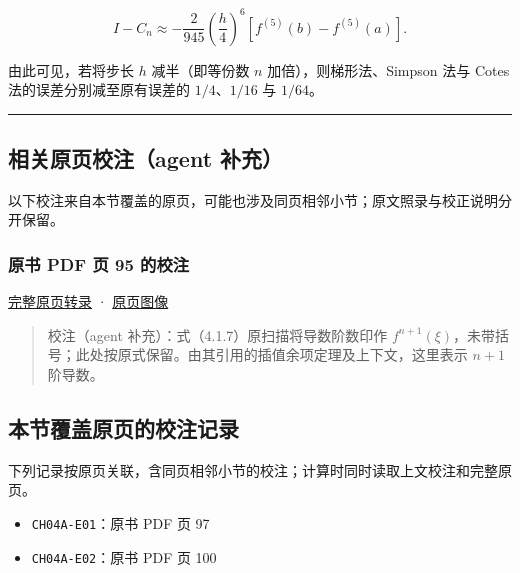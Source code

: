 \documentclass[
  10pt,
  fontset=fandol]{ctexart}
\providecommand{\tightlist}{%
  \setlength{\itemsep}{0pt}\setlength{\parskip}{0pt}}
\begin{document}
\[
I-C_n\approx-\frac2{945}\left(\frac h4\right)^6[f^{(5)}(b)-f^{(5)}(a)].
\tag{4.2.17}
\]

由此可见，若将步长 \(h\) 减半（即等份数 \(n\) 加倍），则梯形法、Simpson 法与 Cotes 法的误差分别减至原有误差的 \(1/4\)、\(1/16\) 与 \(1/64\)。

\begin{center}\rule{0.5\linewidth}{0.5pt}\end{center}

\subsection{相关原页校注（agent 补充）}\label{ux76f8ux5173ux539fux9875ux6821ux6ce8agent-ux8865ux5145}

以下校注来自本节覆盖的原页，可能也涉及同页相邻小节；原文照录与校正说明分开保留。

\subsubsection{原书 PDF 页 95 的校注}\label{ux539fux4e66-pdf-ux9875-95-ux7684ux6821ux6ce8}

\href{../pages/pdf-095.md}{完整原页转录} · \href{../../source-images/pdf-095.jpeg}{原页图像}

\begin{quote}
校注（agent 补充）：式（4.1.7）原扫描将导数阶数印作 \(f^{n+1}(\xi)\)，未带括号；此处按原式保留。由其引用的插值余项定理及上下文，这里表示 \(n+1\) 阶导数。
\end{quote}

\subsection{本节覆盖原页的校注记录}\label{ux672cux8282ux8986ux76d6ux539fux9875ux7684ux6821ux6ce8ux8bb0ux5f55}

下列记录按原页关联，含同页相邻小节的校注；计算时同时读取上文校注和完整原页。

\begin{itemize}
\tightlist
\item
  \texttt{CH04A-E01}：原书 PDF 页 97
\item
  \texttt{CH04A-E02}：原书 PDF 页 100
\end{itemize}
\end{document}
